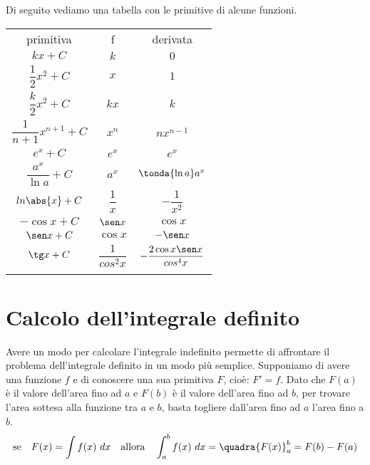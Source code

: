 Di seguito vediamo una tabella con le primitive di alcune funzioni.

{%
\newcommand{\mc}[3]{\multicolumn{#1}{#2}{#3}}
\begin{center}
\begin{tabular}{ccc}
primitiva & \qquad f \qquad & derivata\\
\(k x +C\) & \qquad \(k\) & \qquad \(0\)\\
\(\dfrac{1}{2}x^2 +C\) & \qquad \(x\) \qquad & \(1\)\\
\(\dfrac{k}{2}x^2 +C\) & \qquad \(kx\) \qquad & \(k\)\\
\(\dfrac{1}{n+1}x^{n+1} +C\) & \qquad \(x^n\) \qquad & \(nx^{n-1}\)\\
\(e^x +C\) & \qquad \(e^x\) \qquad & \(e^x\)\\
\(\dfrac{a^x}{\ln{a}} +C\) & \qquad \(a^x\) \qquad & \(\tonda{\ln{a}} a^x\)\\
\(ln \abs{x} +C\) & \qquad \(\dfrac{1}{x}\) \qquad & \(-\dfrac{1}{x^2}\)\\
\(-\cos x +C\) & \qquad \(\sen x\) \qquad & \(\cos x\)\\
\(\sen x +C\) & \qquad \(\cos x\) \qquad & \(-\sen x\)\\
\(\tg x +C\) & \qquad \(\dfrac{1}{cos^2 x}\) \qquad & 
    \(-\dfrac{2 \cos x \sen x}{cos^4 x}\)\\
\(\) & \qquad \(\) \qquad & \(\)\\
\end{tabular}
\end{center}
}%

\section{Calcolo dell'integrale definito}
\label{sec:integrali_indefiniti}

Avere un modo per calcolare l'integrale indefinito permette di affrontare il 
problema dell'integrale definito in un modo più semplice.
Supponiamo di avere una funzione \(f\) e di conoscere una sua primitiva 
\(F\), cioè: \(F' = f\).
Dato che \(F(a)\) è il valore dell'area fino ad \(a\) e 
\(F(b)\) è il valore dell'area fino ad \(b\), 
per trovare l'area sottesa alla funzione tra \(a\) e \(b\),
basta togliere dall'area fino ad \(a\) l'area fino a \(b\).
\[\text{se} \quad F(x) = \int f(x)~dx \quad \text{allora} \quad 
\int_a^b f(x)~dx = \quadra{F(x)}_a^b = F(b) - F(a)\]

